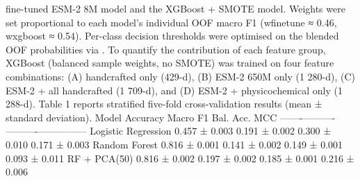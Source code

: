 {}fine-tuned ESM-2 8M model and the XGBoost + SMOTE model. Weights were set proportional to\markdownRendererSoftLineBreak
{}each model's individual OOF macro F1 (w\markdownRendererUnderscore{}finetune ≈ 0.46, w\markdownRendererUnderscore{}xgboost ≈ 0.54). Per-class\markdownRendererSoftLineBreak
{}decision thresholds were optimised on the blended OOF probabilities via\markdownRendererSoftLineBreak
{}.\markdownRendererInterblockSeparator
{}
\markdownRendererSectionEnd \markdownRendererSectionBegin
{}\markdownRendererInterblockSeparator
{}To quantify the contribution of each feature group, XGBoost (balanced sample weights, no SMOTE)\markdownRendererSoftLineBreak
{}was trained on four feature combinations: (A) handcrafted only (429-d), (B) ESM-2 650M only\markdownRendererSoftLineBreak
{}(1 280-d), (C) ESM-2 + all handcrafted (1 709-d), and (D) ESM-2 + physicochemical only\markdownRendererSoftLineBreak
{}(1 288-d).\markdownRendererInterblockSeparator
{}
\markdownRendererSectionEnd 
\markdownRendererSectionEnd \markdownRendererSectionBegin
{}\markdownRendererInterblockSeparator
{}\markdownRendererSectionBegin
{}\markdownRendererInterblockSeparator
{}Table 1 reports stratified five-fold cross-validation results (mean ± standard deviation).\markdownRendererParagraphSeparator
{}\markdownRendererPipe{} Model \markdownRendererPipe{} Accuracy \markdownRendererPipe{} Macro F1 \markdownRendererPipe{} Bal. Acc. \markdownRendererPipe{} MCC \markdownRendererPipe{}\markdownRendererSoftLineBreak
{}\markdownRendererPipe{}-------\markdownRendererPipe{}----------\markdownRendererPipe{}----------\markdownRendererPipe{}-----------\markdownRendererPipe{}-----\markdownRendererPipe{}\markdownRendererSoftLineBreak
{}\markdownRendererPipe{} Logistic Regression \markdownRendererPipe{} 0.457 ± 0.003 \markdownRendererPipe{} 0.191 ± 0.002 \markdownRendererPipe{} 0.300 ± 0.010 \markdownRendererPipe{} 0.171 ± 0.003 \markdownRendererPipe{}\markdownRendererSoftLineBreak
{}\markdownRendererPipe{} Random Forest \markdownRendererPipe{} 0.816 ± 0.001 \markdownRendererPipe{} 0.141 ± 0.002 \markdownRendererPipe{} 0.149 ± 0.001 \markdownRendererPipe{} 0.093 ± 0.011 \markdownRendererPipe{}\markdownRendererSoftLineBreak
{}\markdownRendererPipe{} RF + PCA(50) \markdownRendererPipe{} 0.816 ± 0.002 \markdownRendererPipe{} 0.197 ± 0.002 \markdownRendererPipe{} 0.185 ± 0.001 \markdownRendererPipe{} 0.216 ± 0.006 \markdownRendererPipe{}\markdownRendererSoftLineBreak
